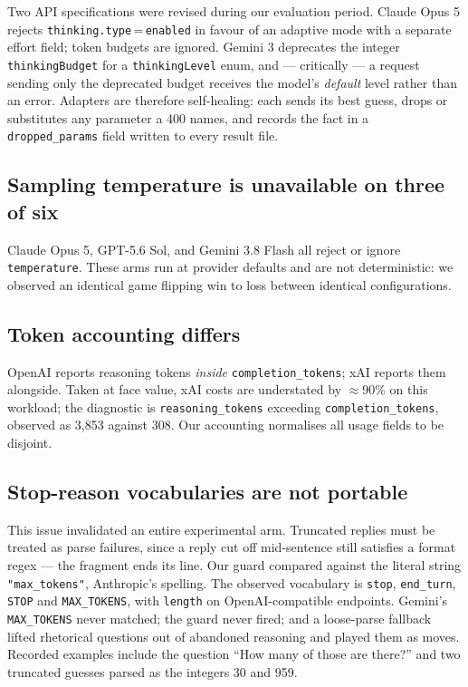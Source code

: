 \documentclass[11pt]{article}
\begin{document}
Two API specifications were revised during our evaluation period. Claude Opus 5 rejects
\texttt{thinking.type}\,=\,\texttt{enabled} in favour of an adaptive mode with a separate
effort field; token budgets are ignored. Gemini 3 deprecates the integer
\texttt{thinkingBudget} for a \texttt{thinkingLevel} enum, and --- critically ---
a request sending only the deprecated budget receives the model's \emph{default}
level rather than an error. Adapters are therefore self-healing: each sends its
best guess, drops or substitutes any parameter a 400 names, and records the fact
in a \texttt{dropped\_params} field written to every result file.

\subsection{Sampling temperature is unavailable on three of six}

Claude Opus 5, GPT-5.6 Sol, and Gemini 3.8 Flash all reject or ignore
\texttt{temperature}. These arms run at provider defaults and are not
deterministic: we observed an identical game flipping win to loss between
identical configurations.

\subsection{Token accounting differs}

OpenAI reports reasoning tokens \emph{inside} \texttt{completion\_tokens}; xAI
reports them alongside. Taken at face value, xAI costs are understated by
$\approx$90\% on this workload; the diagnostic is \texttt{reasoning\_tokens}
exceeding \texttt{completion\_tokens}, observed as 3{,}853 against 308. Our
accounting normalises all usage fields to be disjoint.

\subsection{Stop-reason vocabularies are not portable}
\label{sec:stopreason}

This issue invalidated an entire experimental arm. Truncated replies must be treated as parse failures, since a
reply cut off mid-sentence still satisfies a format regex --- the fragment ends
its line. Our guard compared against the literal string \texttt{"max\_tokens"},
Anthropic's spelling. The observed vocabulary is \texttt{stop},
\texttt{end\_turn}, \texttt{STOP} and \texttt{MAX\_TOKENS}, with
\texttt{length} on OpenAI-compatible endpoints. Gemini's
\texttt{MAX\_TOKENS} never matched; the guard never fired; and a loose-parse
fallback lifted rhetorical questions out of abandoned reasoning and played them
as moves. Recorded examples include the question ``How many of those are
there?'' and two truncated guesses parsed as the integers 30 and 959.
\end{document}
